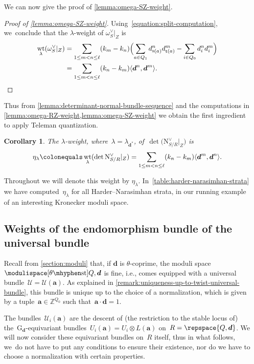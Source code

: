 \documentclass[JEP,XML,SOM,Unicode,NoEqCountersInSection,published]{cedram}
\theoremstyle{plain}
\newtheorem{corollary}[theorem]{Corollary}
\theoremstyle{definition}
\DeclareMathOperator\source{s}
\DeclareMathOperator\target{t}
\DeclareMathOperator\weight{wt}
\newcommand\group[1][\tuple{d}]{\mathrm{G}_{#1}}
\newcommand\normal{\ensuremath{\mathrm{N}}}
\newcommand\stable{\ensuremath{\mhyphen\mathrm{st}}}
\newcommand\tuple[1]{\ensuremath{{\boldsymbol{#1}}}}
\begin{document}
We can now give the proof of \cref{lemma:omega-SZ-weight}.
\begin{proof}[Proof of \cref{lemma:omega-SZ-weight}]
Using~\eqref{equation:split-computation}, we~conclude that the $\lambda$-weight of $\omega_S^\vee|_Z$ is
\begin{align*}
\weight_{\lambda}(\omega_S^\vee|_Z)
&= \sum_{1 \leq m < n \leq \ell} (k_m - k_n) \Bigl(\sum_{a \in Q_1} d_{\source(a)}^n d_{\target(a)}^m - \sum_{i \in Q_0} d_i^n d_i^m\Bigr) \\
&= \sum_{1\leq m < n \leq \ell} (k_n - k_m) \langle \tuple{d}^n,\tuple{d}^m \rangle.\qedhere
\end{align*}
\end{proof}
Thus from \cref{lemma:determinant-normal-bundle-sequence}
and the computations in \cref{lemma:omega-RZ-weight,lemma:omega-SZ-weight}
we obtain the first ingredient to apply Teleman quantization.
\begin{corollary}
\label{corollary:determinant-weight}
The $\lambda$-weight,
where~$\lambda=\lambda_{\tuple{d}^*}$,
of~$\det\bigl(\normal_{S/R}^\vee|_Z\bigr)$ is
\begin{equation}
\eta_\lambda\colonequals\weight_{\lambda}(\det\normal_{S/R}^\vee|_Z) = \sum_{1 \leq m < n \leq \ell}(k_n - k_m)\langle \tuple{d}^m,\tuple{d}^n \rangle.
\end{equation}
\end{corollary}
Throughout we will denote this weight by $\eta_\lambda$. In~\cref{table:harder-narasimhan-strata} we have computed~$\eta_\lambda$
for all Harder--Narasimhan strata,
in our running example of an interesting Kronecker moduli space.

\subsection{Weights of the endomorphism bundle of the universal bundle}
\label{subsection:weights-endomorphism-bundle}
Recall from \cref{section:moduli} that,
if $\tuple{d}$ is $\theta$-coprime,
the moduli space~$\modulispace[\theta\stable]{Q,\tuple{d}}$
is fine, i.e.,
comes equipped with a universal bundle~$\mathcal{U}=\mathcal{U}(\tuple{a})$.
As explained in \cref{remark:uniqueness-up-to-twist-universal-bundle},
this bundle is unique up to the choice of a normalization,
which is given by a tuple~$\tuple{a}\in\mathbb{Z}^{Q_0}$ such that~$\tuple{a}\cdot\tuple{d}=1$.

The bundles~$\mathcal{U}_i(\tuple{a})$ are the descent of
(the restriction to the stable locus of)
the~$\group$\nobreakdash-equivariant bundles~$U_i(\tuple{a})=U_i\otimes L(\tuple{a})$
on~$R=\repspace{Q,\tuple{d}}$.
We will now consider these equivariant bundles on~$R$ itself,
thus in what follows, we~do not have to put any conditions to ensure their existence,
nor do we have to choose a normalization with certain properties.
\end{document}
